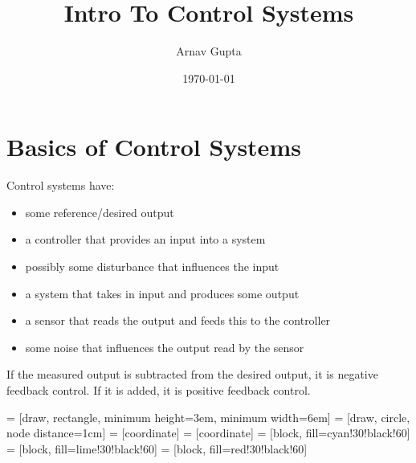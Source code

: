 \documentclass[11pt]{article}
\author{Arnav Gupta}
\date{\today}
\title{Intro To Control Systems}
\begin{document}
\maketitle
\tableofcontents

\section{Basics of Control Systems}
\label{sec:org8b8a44a}
Control systems have:
\begin{itemize}
\item some reference/desired output
\item a controller that provides an input into a system
\item possibly some disturbance that influences the input
\item a system that takes in input and produces some output
\item a sensor that reads the output and feeds this to the controller
\item some noise that influences the output read by the sensor
\end{itemize}

If the measured output is subtracted from the desired output, it is
negative feedback control. If it is added, it is positive feedback
control.

 = [draw, rectangle, minimum height=3em, minimum width=6em]
 = [draw, circle, node distance=1cm]
 = [coordinate]
 = [coordinate]
 = [block, fill=cyan!30!black!60]
 = [block, fill=lime!30!black!60]
 = [block, fill=red!30!black!60]
\begin{center}
\end{center}
\end{document}
